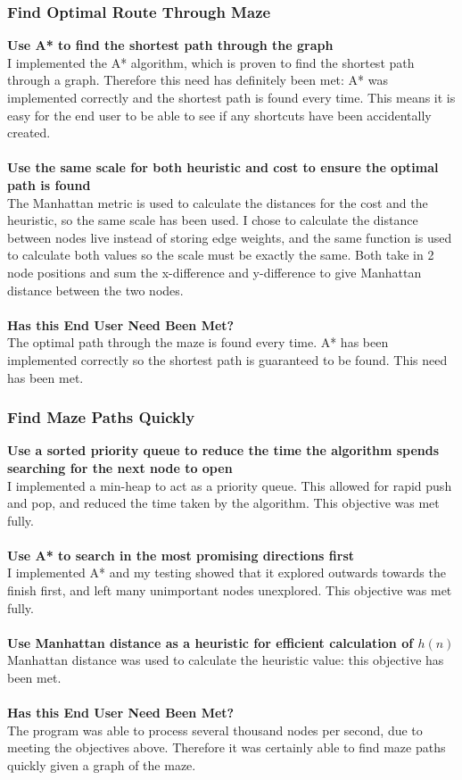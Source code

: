 \documentclass[titlepage]{article}
\begin{document}
\subsubsection{Find Optimal Route Through Maze}
\textbf{Use A* to find the shortest path through the graph}\\
I implemented the A* algorithm, which is proven to find the shortest path through a graph.  Therefore this need has definitely been met: A* was implemented correctly and the shortest path is found every time. This means it is easy for the end user to be able to see if any shortcuts have been accidentally created. \\\\
\textbf{Use the same scale for both heuristic and cost to ensure the optimal path is found}\\
The Manhattan metric is used to calculate the distances for the cost and the heuristic, so the same scale has been used. I chose to calculate the distance between nodes live instead of storing edge weights, and the same function is used to calculate both values so the scale must be exactly the same. Both take in 2 node positions and sum the x-difference and y-difference to give Manhattan distance between the two nodes. \\\\
\textbf{Has this End User Need Been Met?}\\
The optimal path through the maze is found every time. A* has been implemented correctly so the shortest path is guaranteed to be found. This need has been met.

\subsubsection{Find Maze Paths Quickly}
\textbf{Use a sorted priority queue to reduce the time the algorithm spends searching for the next node to open}\\
I implemented a min-heap to act as a priority queue. This allowed for rapid push and pop, and reduced the time taken by the algorithm. This objective was met fully.\\\\
\textbf{Use A* to search in the most promising directions first}\\
I implemented A* and my testing showed that it explored outwards towards the finish first, and left many unimportant nodes unexplored. This objective was met fully.\\\\
\textbf{Use Manhattan distance as a heuristic for efficient calculation of $h(n)$}\\
Manhattan distance was used to calculate the heuristic value: this objective has been met.\\\\
\textbf{Has this End User Need Been Met?}\\
The program was able to process several thousand nodes per second, due to meeting the objectives above. Therefore it was certainly able to find maze paths quickly given a graph of the maze.
\end{document}
